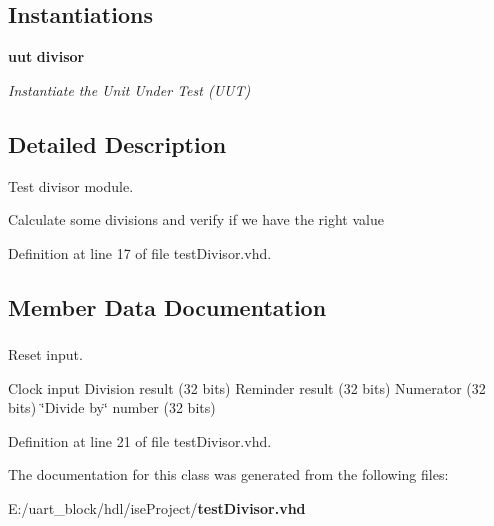 \subsection*{Instantiations}
 \begin{DoxyCompactItemize}
\item 
{\bf uut}  {\bfseries divisor}   \label{classtest_divisor_1_1behavior_a1619316ad715601eb5d3559db829ac05}

\begin{DoxyCompactList}\small\item\em Instantiate the Unit Under Test (U\-U\-T) \end{DoxyCompactList}\end{DoxyCompactItemize}


\subsection{Detailed Description}
Test divisor module. 

Calculate some divisions and verify if we have the right value 

Definition at line 17 of file test\-Divisor.\-vhd.



\subsection{Member Data Documentation}
\subsubsection[{divisor}]{ {\bfseries  } \hspace{0.3cm}{\ttfamily  [Component]}}\label{classtest_divisor_1_1behavior_ab31bbf4e04b601f06da44e54e616cc99}


Reset input. 

Clock input Division result (32 bits) Reminder result (32 bits) Numerator (32 bits) \char`\"{}\-Divide by\char`\"{} number (32 bits) 

Definition at line 21 of file test\-Divisor.\-vhd.



The documentation for this class was generated from the following files\-:\begin{DoxyCompactItemize}
\item 
E\-:/uart\-\_\-block/hdl/ise\-Project/{\bf test\-Divisor.\-vhd}\end{DoxyCompactItemize}
